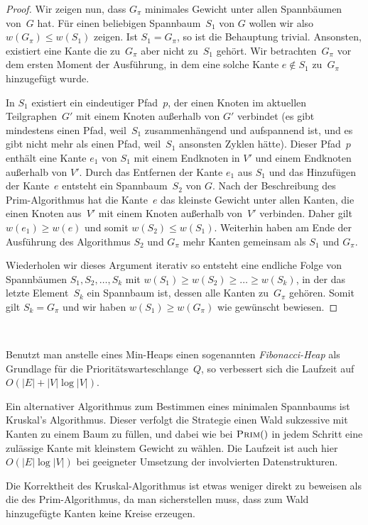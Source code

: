 \begin{proof}
Wir zeigen nun, dass $G_\pi$ minimales Gewicht unter allen Spannbäumen von~$G$ hat.
Für einen beliebigen Spannbaum~$S_1$ von $G$ wollen wir also $w(G_\pi) \le w(S_1)$ zeigen.
Ist $S_1=G_\pi$, so ist die Behauptung trivial. 
Ansonsten, existiert eine Kante die zu~$G_\pi$ aber nicht zu~$S_1$ gehört.
Wir betrachten~$G_\pi$ vor dem ersten Moment der Ausführung, in dem eine solche Kante $e \not\in S_1$ zu~$G_\pi$ hinzugefügt wurde. 
	
In $S_1$ existiert ein eindeutiger Pfad~$p$, der einen Knoten im aktuellen Teilgraphen~$G'$ mit einem Knoten außerhalb von $G'$ verbindet (es gibt mindestens einen Pfad, weil~$S_1$ zusammenhängend und aufspannend ist, und es gibt nicht mehr als einen Pfad, weil~$S_1$ ansonsten Zyklen hätte).
Dieser Pfad~$p$ enthält eine Kante $e_1$ von $S_1$ mit einem Endknoten in $V'$ und einem Endknoten außerhalb von $V'$.
Durch das Entfernen der Kante $e_1$ aus $S_1$ und das Hinzufügen der Kante~$e$ entsteht ein Spannbaum~$S_2$ von $G$. 
Nach der Beschreibung des Prim-Algorithmus hat die Kante~$e$ das kleinste Gewicht unter allen Kanten, die einen Knoten aus~$V'$ mit einem Knoten außerhalb von~$V'$ verbinden.
Daher gilt $w(e_1) \ge w(e)$ und somit $w(S_2) \le w(S_1)$.
Weiterhin haben am Ende der Ausführung des Algorithmus $S_2$ und $G_\pi$ mehr Kanten gemeinsam als $S_1$ und $G_\pi$.

Wiederholen wir dieses Argument iterativ so entsteht eine endliche Folge von Spannbäumen $S_1, S_2,\ldots, S_k$ mit $w(S_1) \ge w(S_2) \ge \ldots \geq w(S_k)$, in der das letzte Element~$S_k$ ein Spannbaum ist, dessen alle Kanten zu~$G_\pi$ gehören.
Somit gilt $S_k=G_\pi$ und wir haben $w(S_1) \ge w(G_\pi)$ wie gewünscht bewiesen.
\end{proof}


\begin{bem}\
\begin{enuma}
 \item Benutzt man anstelle eines Min-Heaps einen sogenannten \emph{Fibonacci-Heap} als Grundlage für die Prioritätswarteschlange~$Q$, so verbessert sich die Laufzeit auf $O(|E|+|V|\log|V|)$.

 \item Ein alternativer Algorithmus zum Bestimmen eines minimalen Spannbaums ist Kruskal's Algorithmus.
Dieser verfolgt die Strategie einen Wald sukzessive mit Kanten zu einem Baum zu füllen, und dabei wie bei $\mathop{\text{\textsc{Prim}}}()$ in jedem Schritt eine zulässige Kante mit kleinstem Gewicht zu wählen.
Die Laufzeit ist auch hier $O(|E|\log|V|)$ bei geeigneter Umsetzung der involvierten Datenstrukturen.

Die Korrektheit des Kruskal-Algorithmus ist etwas weniger direkt zu beweisen als die des Prim-Algorithmus, da man sicherstellen muss, dass zum Wald hinzugefügte Kanten keine Kreise erzeugen.

\end{enuma}
\end{bem}